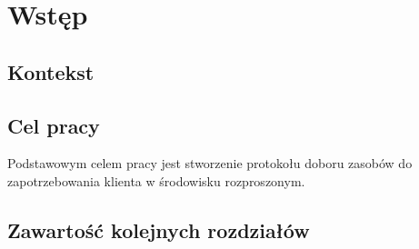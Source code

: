 \chapter{Wstęp}

\section{Kontekst}
\section{Cel pracy}

Podstawowym celem pracy jest stworzenie protokołu doboru zasobów do zapotrzebowania klienta w środowisku rozproszonym.

\section{Zawartość kolejnych rozdziałów}
